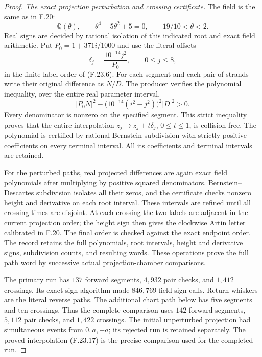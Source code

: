\begin{proof}
\emph{The exact projection perturbation and crossing certificate.}
The field is the same as in F.20:
\[
 \mathbb Q(\theta),\qquad
 \theta^4-5\theta^2+5=0,\qquad 19/10<\theta<2.
\]
Real signs are decided by rational isolation of this indicated
root and exact field arithmetic. Put $P_0=1+371i/1000$ and use
the literal offsets
\[
 \delta_j=\frac{10^{-14}j^2}{P_0},
                  \qquad 0\leq j\leq8,                       \tag{F.23.16}
\]
in the finite-label order of (F.23.6).
For each segment and each pair of strands write their original
difference as $N/D$. The producer verifies the polynomial
inequality, over the entire real parameter interval,
\[
 |P_0N|^2-\bigl(10^{-14}(i^2-j^2)\bigr)^2|D|^2>0.
                                                               \tag{F.23.17}
\]
Every denominator is nonzero on the specified segment.
This strict inequality proves that the entire interpolation
$z_j\mapsto z_j+t\delta_j$, $0\leq t\leq1$, is collision-free.
The polynomial is certified by rational Bernstein subdivision
with strictly positive coefficients on every terminal interval.
All its coefficients and terminal intervals are retained.

For the perturbed paths, real projected differences are again
exact field polynomials after multiplying by positive squared
denominators. Bernstein--Descartes subdivision isolates all their
zeros, and the certificate checks nonzero height and derivative
on each root interval. These intervals are refined until all
crossing times are disjoint. At each crossing the two labels
are adjacent in the current projection order; the height sign
then gives the clockwise Artin letter calibrated in F.20.
The final order is checked against the exact endpoint order.
The record retains the full polynomials, root intervals, height
and derivative signs, subdivision counts, and resulting words.
These operations prove the full path word by successive actual
projection-chamber comparisons.

The primary run has $137$ forward segments, $4,932$ pair checks,
and $1,412$ crossings. Its exact sign algorithm made $846,769$
field-sign calls. Return whiskers are the literal reverse paths.
The additional chart path below has five segments and ten
crossings. Thus the complete comparison uses $142$ forward
segments, $5,112$ pair checks, and $1,422$ crossings. The initial
unperturbed projection had simultaneous events from $0,a,-a$;
its rejected run is retained separately. The proved interpolation
(F.23.17) is the precise comparison used for the completed run.


\end{proof}
